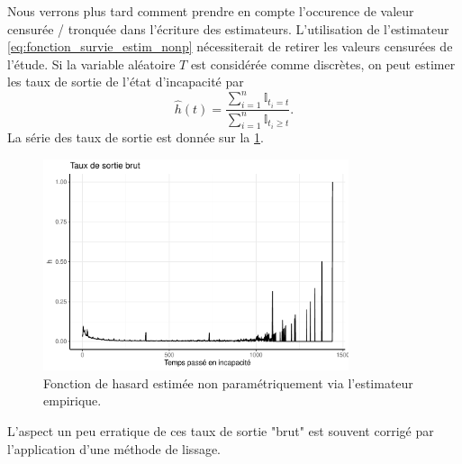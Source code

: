 Nous verrons plus tard comment prendre en compte l'occurence de valeur censurée / tronquée dans l'écriture des estimateurs. L'utilisation de l'estimateur \eqref{eq:fonction_survie_estim_nonp} nécessiterait de retirer les valeurs censurées de l'étude. Si la variable aléatoire $T$ est considérée comme discrètes, on peut estimer les taux de sortie de l'état d'incapacité par 
$$
\widehat{h}(t) = \frac{\sum_{i=1}^n\mathbb{I}_{t_{i} = t}}{\sum_{i=1}^n\mathbb{I}_{t_{i} \geq t}}.
$$
La série des taux de sortie est donnée sur la \cref{fig:INC_h_nonp}.
\begin{figure}[h!]
\centering
\includegraphics[width = 0.8\textwidth]{../figures/INC_h_nonp}
\caption{Fonction de hasard estimée non paramétriquement via l'estimateur empirique.}
\label{fig:INC_h_nonp}
\end{figure}
L'aspect un peu erratique de ces taux de sortie "brut" est souvent corrigé par l'application d'une méthode de lissage.
